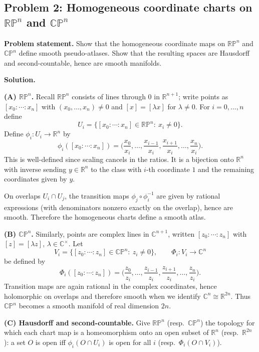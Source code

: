 \documentclass[12pt,a4paper]{article}
\theoremstyle{plain}
\theoremstyle{definition}      %
\begin{document}

\subsection*{Problem 2: Homogeneous coordinate charts on $\mathbb{RP}^n$ and $\mathbb{CP}^n$}

\noindent\textbf{Problem statement.}
Show that the homogeneous coordinate maps on $\mathbb{RP}^n$ and $\mathbb{CP}^n$ define smooth pseudo-atlases.
Show that the resulting spaces are Hausdorff and second-countable, hence are smooth manifolds.

\medskip
\noindent\textbf{Solution.}

\smallskip
\noindent\textbf{(A) $\mathbb{RP}^n$.}
Recall $\mathbb{RP}^n$ consists of lines through $0$ in $\mathbb R^{n+1}$; write points as
$[x_0:\cdots:x_n]$ with $(x_0,\dots,x_n)\neq 0$ and $[x]=[\lambda x]$ for $\lambda\neq 0$.
For $i=0,\dots,n$ define
\[
U_i=\{[x_0:\cdots:x_n]\in\mathbb{RP}^n:\ x_i\neq 0\}.
\]
Define $\phi_i:U_i\to\mathbb R^n$ by
\[
\phi_i([x_0:\cdots:x_n])
=
\Big(\frac{x_0}{x_i},\dots,\frac{x_{i-1}}{x_i},\frac{x_{i+1}}{x_i},\dots,\frac{x_n}{x_i}\Big).
\]
This is well-defined since scaling cancels in the ratios. It is a bijection onto $\mathbb R^n$ with inverse
sending $y\in\mathbb R^n$ to the class with $i$-th coordinate $1$ and the remaining coordinates given by $y$.

On overlaps $U_i\cap U_j$, the transition maps $\phi_j\circ\phi_i^{-1}$ are given by rational expressions
(with denominators nonzero exactly on the overlap), hence are smooth. Therefore the homogeneous charts define a smooth atlas.

\smallskip
\noindent\textbf{(B) $\mathbb{CP}^n$.}
Similarly, points are complex lines in $\mathbb C^{n+1}$, written $[z_0:\cdots:z_n]$ with $[z]=[\lambda z]$, $\lambda\in\mathbb C^\times$.
Let
\[
V_i=\{[z_0:\cdots:z_n]\in\mathbb{CP}^n:\ z_i\neq 0\},
\qquad
\Phi_i:V_i\to\mathbb C^n
\]
be defined by
\[
\Phi_i([z_0:\cdots:z_n])
=
\Big(\frac{z_0}{z_i},\dots,\frac{z_{i-1}}{z_i},\frac{z_{i+1}}{z_i},\dots,\frac{z_n}{z_i}\Big).
\]
Transition maps are again rational in the complex coordinates, hence holomorphic on overlaps and therefore smooth
when we identify $\mathbb C^n\cong\mathbb R^{2n}$. Thus $\mathbb{CP}^n$ becomes a smooth manifold of real dimension $2n$.

\smallskip
\noindent\textbf{(C) Hausdorff and second-countable.}
Give $\mathbb{RP}^n$ (resp.\ $\mathbb{CP}^n$) the topology for which each chart map is a homeomorphism onto an open subset of $\mathbb R^n$
(resp.\ $\mathbb R^{2n}$): a set $O$ is open iff $\phi_i(O\cap U_i)$ is open for all $i$ (resp.\ $\Phi_i(O\cap V_i)$).
\end{document}
